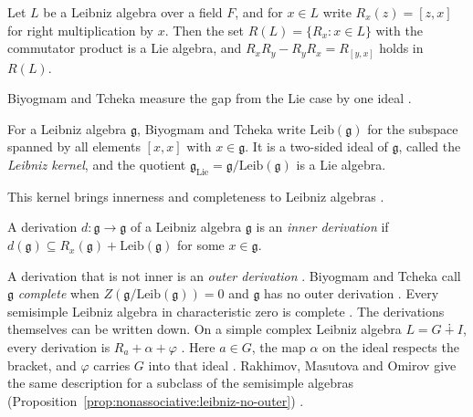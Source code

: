 \begin{proposition}
\label{prop:nonassociative:leibniz-right}
Let $L$ be a Leibniz algebra over a field $F$, and for $x\in L$ write
$R_x(z)=[z,x]$ for right multiplication by $x$. Then the set
$R(L)=\{R_x:x\in L\}$ with the commutator product is a Lie algebra, and
$R_xR_y-R_yR_x=R_{[y,x]}$ holds in $R(L)$.
\end{proposition}

Biyogmam and Tcheka measure the gap from the Lie case by one ideal
\cite[p.~2191]{BiyogmamTcheka2021Outer}.

\begin{definition}
\label{def:nonassociative:leibniz-kernel}
For a Leibniz algebra $\mathfrak{g}$, Biyogmam and Tcheka write
$\mathrm{Leib}(\mathfrak{g})$ for the subspace spanned by all elements
$[x,x]$ with $x\in\mathfrak{g}$. It is a two-sided ideal of
$\mathfrak{g}$, called the \emph{Leibniz kernel}, and the quotient
$\mathfrak{g}_{\mathrm{Lie}}=\mathfrak{g}/\mathrm{Leib}(\mathfrak{g})$
is a Lie algebra.
\end{definition}

This kernel brings innerness and completeness to Leibniz algebras
\cite[Definition~2.4 and Definition~3.3,
p.~2191]{BiyogmamTcheka2021Outer}.

\begin{definition}
\label{def:nonassociative:leibniz-inner}
A derivation $d\colon\mathfrak{g}\to\mathfrak{g}$ of a Leibniz algebra
$\mathfrak{g}$ is an \emph{inner derivation} if
$d(\mathfrak{g})\subseteq R_x(\mathfrak{g})+
\mathrm{Leib}(\mathfrak{g})$ for some $x\in\mathfrak{g}$.
\end{definition}

A derivation that is not inner is an \emph{outer derivation}
\cite[Definition~3.3, p.~2193]{BiyogmamTcheka2021Outer}. Biyogmam and Tcheka
call $\mathfrak{g}$ \emph{complete} when
$Z(\mathfrak{g}/\mathrm{Leib}(\mathfrak{g}))=0$ and $\mathfrak{g}$ has no
outer derivation \cite[Definition~3.3, p.~2193]{BiyogmamTcheka2021Outer}.
Every semisimple Leibniz algebra in characteristic zero is complete
\cite[Definition~3.3, p.~2193]{BiyogmamTcheka2021Outer}. The derivations
themselves can be written down. On a simple complex Leibniz algebra
$L=G\dotplus I$, every derivation is $R_{a}+\alpha+\varphi$
\cite[Theorem~3.2]{RakhimovMasutovaOmirov2017}. Here
$a\in G$, the map $\alpha$ on the ideal respects the bracket, and $\varphi$
carries $G$ into that ideal \cite[Theorem~3.2]{RakhimovMasutovaOmirov2017}.
Rakhimov, Masutova and Omirov give the same description for a subclass of the
semisimple algebras (Proposition~\ref{prop:nonassociative:leibniz-no-outer})
\cite[Abstract, p.~1]{RakhimovMasutovaOmirov2017}.

